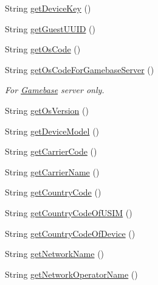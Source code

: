\begin{DoxyCompactItemize}
String \hyperlink{classcom_1_1toast_1_1android_1_1gamebase_1_1_gamebase_system_info_a946aee63d952b390e1d4a96fa3e34407}{get\+Device\+Key} ()
\item 
String \hyperlink{classcom_1_1toast_1_1android_1_1gamebase_1_1_gamebase_system_info_a6056123d9b0c179c561e9d3567dda1e1}{get\+Guest\+U\+U\+ID} ()
\item 
String \hyperlink{classcom_1_1toast_1_1android_1_1gamebase_1_1_gamebase_system_info_a09cd485b3374d15bfa8427561e0519eb}{get\+Os\+Code} ()
\item 
String \hyperlink{classcom_1_1toast_1_1android_1_1gamebase_1_1_gamebase_system_info_ae09bfac0653ddf82f3f0c212920adf5d}{get\+Os\+Code\+For\+Gamebase\+Server} ()
\begin{DoxyCompactList}\small\item\em For \hyperlink{classcom_1_1toast_1_1android_1_1gamebase_1_1_gamebase}{Gamebase} server only. \end{DoxyCompactList}\item 
String \hyperlink{classcom_1_1toast_1_1android_1_1gamebase_1_1_gamebase_system_info_a75dd085e54859a06591569506f44f239}{get\+Os\+Version} ()
\item 
String \hyperlink{classcom_1_1toast_1_1android_1_1gamebase_1_1_gamebase_system_info_a2421e1d78f27dbf40117abb08a51c4ee}{get\+Device\+Model} ()
\item 
String \hyperlink{classcom_1_1toast_1_1android_1_1gamebase_1_1_gamebase_system_info_acfa4d35bf9e6ba7f7969594ab0bfadca}{get\+Carrier\+Code} ()
\item 
String \hyperlink{classcom_1_1toast_1_1android_1_1gamebase_1_1_gamebase_system_info_ad8615ca8422f04181a874fe1f074b83c}{get\+Carrier\+Name} ()
\item 
String \hyperlink{classcom_1_1toast_1_1android_1_1gamebase_1_1_gamebase_system_info_a561de249511c5e6d25b6b563eb95b80a}{get\+Country\+Code} ()
\item 
String \hyperlink{classcom_1_1toast_1_1android_1_1gamebase_1_1_gamebase_system_info_a6083afa83908e929ce4ed58b853c4ae0}{get\+Country\+Code\+Of\+U\+S\+IM} ()
\item 
String \hyperlink{classcom_1_1toast_1_1android_1_1gamebase_1_1_gamebase_system_info_ae7f1fdcb983f98bd6220772e99634882}{get\+Country\+Code\+Of\+Device} ()
\item 
String \hyperlink{classcom_1_1toast_1_1android_1_1gamebase_1_1_gamebase_system_info_a64d7089264ecfe4f26a6039bd1ff9ae9}{get\+Network\+Name} ()
\item 
String \hyperlink{classcom_1_1toast_1_1android_1_1gamebase_1_1_gamebase_system_info_a52ac29facb967ad6cf6330c499de1a83}{get\+Network\+Operator\+Name} ()

\end{DoxyCompactItemize}

